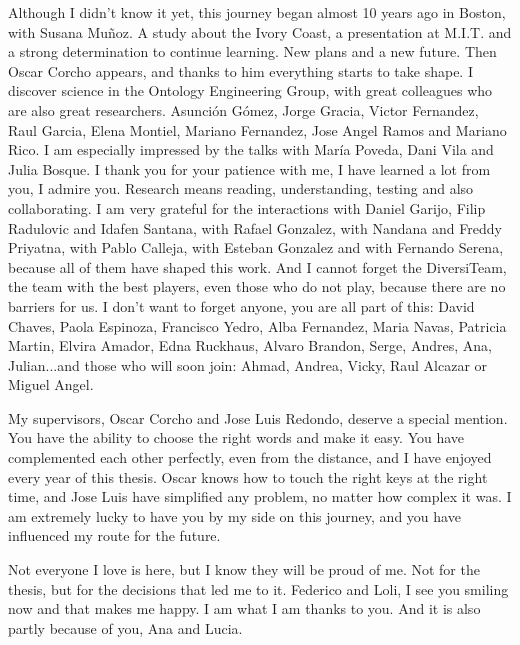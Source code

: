 

\begin{acknowledgementslong} %

Although I didn't know it yet, this journey began almost 10 years ago in Boston, with Susana Muñoz. A study about the Ivory Coast, a presentation at M.I.T. and a strong determination to continue learning. New plans and a new future. Then Oscar Corcho appears, and thanks to him everything starts to take shape. I discover science in the Ontology Engineering Group, with great colleagues who are also great researchers. Asunción Gómez, Jorge Gracia, Victor Fernandez, Raul Garcia, Elena Montiel, Mariano Fernandez, Jose Angel Ramos and Mariano Rico. I am especially impressed by the talks with María Poveda, Dani Vila and Julia Bosque. I thank you for your patience with me, I have learned a lot from you, I admire you. Research means reading, understanding, testing and also collaborating. I am very grateful for the interactions with Daniel Garijo, Filip Radulovic and Idafen Santana, with Rafael Gonzalez, with Nandana and Freddy Priyatna, with Pablo Calleja, with Esteban Gonzalez and with Fernando Serena, because all of them have shaped this work. And I cannot forget the DiversiTeam, the team with the best players, even those who do not play, because there are no barriers for us. I don't want to forget anyone, you are all part of this: David Chaves, Paola Espinoza, Francisco Yedro, Alba Fernandez, Maria Navas, Patricia Martin, Elvira Amador, Edna Ruckhaus, Alvaro Brandon, Serge, Andres, Ana, Julian...and those who will soon join: Ahmad, Andrea, Vicky, Raul Alcazar or Miguel Angel.


My supervisors, Oscar Corcho and Jose Luis Redondo, deserve a special mention. You have the ability to choose the right words and make it easy. You have complemented each other perfectly, even from the distance, and I have enjoyed every year of this thesis. Oscar knows how to touch the right keys at the right time, and Jose Luis have simplified any problem, no matter how complex it was. I am extremely lucky to have you by my side on this journey, and you have influenced my route for the future.


Not everyone I love is here, but I know they will be proud of me. Not for the thesis, but for the decisions that led me to it. Federico and Loli, I see you smiling now and that makes me happy. I am what I am thanks to you. And it is also partly because of you, Ana and Lucia.


\end{acknowledgementslong}
